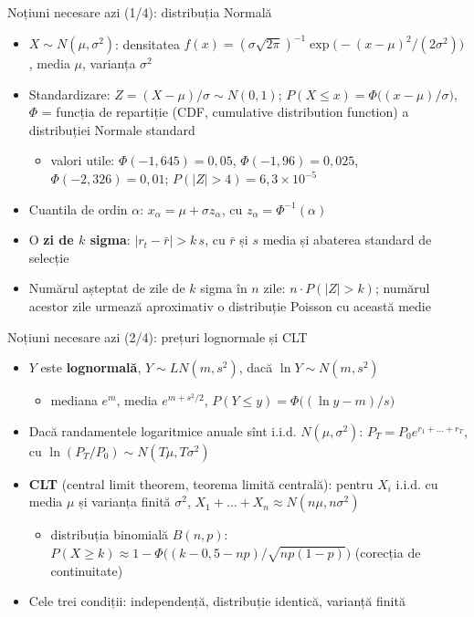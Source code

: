 \begin{frame}{Noțiuni necesare azi (1/4): distribuția Normală}
\itemsize{\footnotesize}
\begin{itemize}
    \item $X \sim N(\mu, \sigma^2)$: densitatea $f(x) = (\sigma\sqrt{2\pi})^{-1}\exp\big(-(x-\mu)^2/(2\sigma^2)\big)$, media $\mu$, varianța $\sigma^2$
    \item Standardizare: $Z = (X - \mu)/\sigma \sim N(0,1)$; $P(X \le x) = \Phi\big((x - \mu)/\sigma\big)$, $\Phi$ = funcția de repartiție (CDF, cumulative distribution function) a distribuției Normale standard
    \begin{itemize}
        \item valori utile: $\Phi(-1{,}645) = 0{,}05$, $\Phi(-1{,}96) = 0{,}025$, $\Phi(-2{,}326) = 0{,}01$; $P(|Z| > 4) = 6{,}3 \times 10^{-5}$
    \end{itemize}
    \item Cuantila de ordin $\alpha$: $x_\alpha = \mu + \sigma z_\alpha$, cu $z_\alpha = \Phi^{-1}(\alpha)$
    \item O \textbf{zi de $k$ sigma}: $|r_t - \bar r| > k\,s$, cu $\bar r$ și $s$ media și abaterea standard de selecție
    \item Numărul așteptat de zile de $k$ sigma în $n$ zile: $n \cdot P(|Z| > k)$; numărul acestor zile urmează aproximativ o distribuție Poisson cu această medie
\end{itemize}
\end{frame}

\begin{frame}{Noțiuni necesare azi (2/4): prețuri lognormale și CLT}
\itemsize{\footnotesize}
\begin{itemize}
    \item $Y$ este \textbf{lognormală}, $Y \sim LN(m, s^2)$, dacă $\ln Y \sim N(m, s^2)$
    \begin{itemize}
        \item mediana $e^m$, media $e^{m + s^2/2}$, $P(Y \le y) = \Phi\big((\ln y - m)/s\big)$
    \end{itemize}
    \item Dacă randamentele logaritmice anuale sînt i.i.d. $N(\mu, \sigma^2)$: $P_T = P_0 e^{r_1 + \dots + r_T}$, cu $\ln(P_T/P_0) \sim N(T\mu, T\sigma^2)$
    \item \textbf{CLT} (central limit theorem, teorema limită centrală): pentru $X_i$ i.i.d. cu media $\mu$ și varianța finită $\sigma^2$, $X_1 + \dots + X_n \approx N(n\mu, n\sigma^2)$
    \begin{itemize}
        \item distribuția binomială $B(n, p)$: $P(X \ge k) \approx 1 - \Phi\big((k - 0{,}5 - np)/\sqrt{np(1-p)}\big)$ (corecția de continuitate)
    \end{itemize}
    \item Cele trei condiții: independență, distribuție identică, varianță finită
\end{itemize}
\end{frame}

